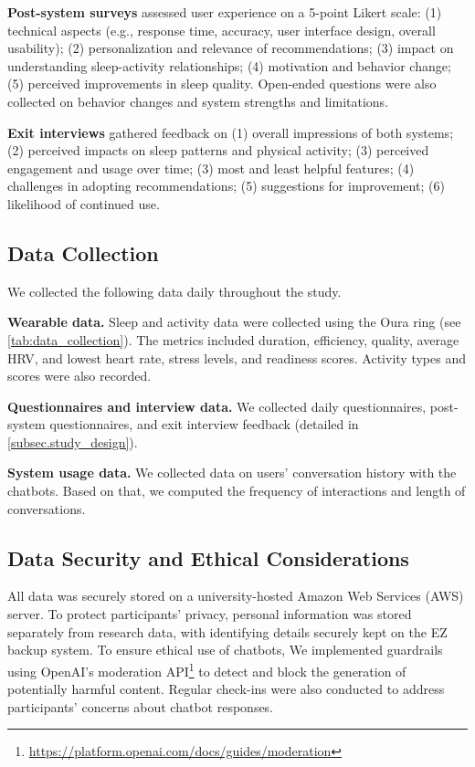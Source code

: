 \textbf{Post-system surveys}
assessed user experience on a 5-point Likert scale:
(1) technical aspects (e.g., response time, accuracy, user interface design, overall usability);
(2) personalization and relevance of recommendations;
(3) impact on understanding sleep-activity relationships;
(4) motivation and behavior change;
(5) perceived improvements in sleep quality.
Open-ended questions were also collected on behavior changes and system strengths and limitations.

\textbf{Exit interviews}
gathered feedback on
(1) overall impressions of both systems;
(2) perceived impacts on sleep patterns and physical activity;
(3) perceived engagement and usage over time;
(3) most and least helpful features;
(4) challenges in adopting recommendations;
(5) suggestions for improvement;
(6) likelihood of continued use.

\subsection{Data Collection}
We collected the following data daily throughout the study. 

\textbf{Wearable data.}
Sleep and activity data were collected using the Oura ring (see \autoref{tab:data_collection}). The metrics included duration, efficiency, quality, average HRV, and lowest heart rate, stress levels, and readiness scores.
Activity types and scores were also recorded.

\textbf{Questionnaires and interview data.}
We collected daily questionnaires, post-system questionnaires, and exit interview feedback (detailed in \autoref{subsec.study_design}).

\textbf{System usage data.}
We collected data on users' conversation history with the chatbots.
Based on that, we computed the frequency of interactions and length of conversations.

\subsection{Data Security and Ethical Considerations}
All data was securely stored on a university-hosted Amazon Web Services (AWS) server. 
To protect participants’ privacy, personal information was stored separately from research data, with identifying details securely kept on the EZ backup system.
To ensure ethical use of chatbots, 
We implemented guardrails using OpenAI's moderation API\footnote{\url{https://platform.openai.com/docs/guides/moderation}} to detect and block the generation of potentially harmful content.
Regular check-ins were also conducted to address participants' concerns about chatbot responses.

